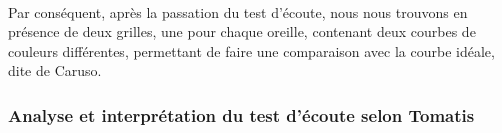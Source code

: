  \\
 Par conséquent, après la passation du test d\textquoteright écoute, nous nous
trouvons en présence de deux grilles, une  pour chaque oreille, contenant deux courbes
de couleurs différentes, permettant de faire une comparaison avec la courbe
 idéale, dite de Caruso.
\subsubsection{Analyse et interprétation du test d'écoute selon Tomatis}

